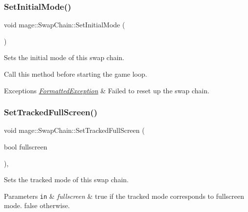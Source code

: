 \subsubsection{\texorpdfstring{Set\+Initial\+Mode()}{SetInitialMode()}}
{\footnotesize\ttfamily void mage\+::\+Swap\+Chain\+::\+Set\+Initial\+Mode (\begin{DoxyParamCaption}{ }\end{DoxyParamCaption})}

Sets the initial mode of this swap chain.

Call this method before starting the game loop.


\begin{DoxyExceptions}{Exceptions}
{\em \hyperlink{structmage_1_1_formatted_exception}{Formatted\+Exception}} & Failed to reset up the swap chain. \\
\hline
\end{DoxyExceptions}
\hypertarget{classmage_1_1_swap_chain_ae2689c07632f1fdc8367c9eefd62851b}{}\label{classmage_1_1_swap_chain_ae2689c07632f1fdc8367c9eefd62851b} 
\subsubsection{\texorpdfstring{Set\+Tracked\+Full\+Screen()}{SetTrackedFullScreen()}}
{\footnotesize\ttfamily void mage\+::\+Swap\+Chain\+::\+Set\+Tracked\+Full\+Screen (\begin{DoxyParamCaption}\item[{bool}]{fullscreen }\end{DoxyParamCaption})\hspace{0.3cm}{\ttfamily [private]}, {\ttfamily [noexcept]}}

Sets the tracked mode of this swap chain.


\begin{DoxyParams}[1]{Parameters}
\mbox{\tt in}  & {\em fullscreen} & {\ttfamily true} if the tracked mode corresponds to fullscreen mode. {\ttfamily false} otherwise. \\
\hline
\end{DoxyParams}
\hypertarget{classmage_1_1_swap_chain_aec2b14bc569046174f6a416a7f20c8d5}{}\label{classmage_1_1_swap_chain_aec2b14bc569046174f6a416a7f20c8d5} 
